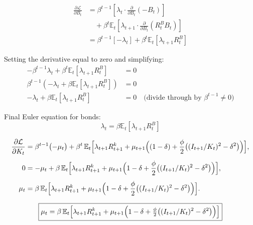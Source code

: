 \documentclass[11pt,preprint]{elsarticle}
\numberwithin{equation}{section}
\numberwithin{figure}{section}
\numberwithin{table}{section}
\begin{document}
\begin{align*}
\frac{\partial \mathcal{L}}{\partial B_t} 
&= \beta^{t-1} \left[ 
   \lambda_t \cdot \frac{\partial}{\partial B_t} (-B_t) %
\right] \\
&\quad + \beta^{t} \mathbb{E}_t \left[ 
   \lambda_{t+1} \cdot \frac{\partial}{\partial B_t} (R^B_t B_t) %
\right] \\
&= \beta^{t-1} \left[ -\lambda_t \right] %
+ \beta^{t} \mathbb{E}_t \left[ \lambda_{t+1} R^B_t \right] %
\end{align*}

Setting the derivative equal to zero and simplifying: \begin{align*}
-\beta^{t-1}\lambda_t + \beta^{t}\mathbb{E}_t\left[\lambda_{t+1}R^B_t\right] &= 0 \\
\beta^{t-1}\left(-\lambda_t + \beta\mathbb{E}_t\left[\lambda_{t+1}R^B_t\right]\right) &= 0 \\
-\lambda_t + \beta\mathbb{E}_t\left[\lambda_{t+1}R^B_t\right] &= 0 \quad \text{(divide through by } \beta^{t-1} \neq 0\text{)}
\end{align*}

Final Euler equation for bonds: \begin{equation}\label{foc_B}
\boxed{\lambda_t = \beta \mathbb{E}_t\left[\lambda_{t+1}R^B_t\right]}
\end{equation}

\begin{align*}
\frac{\partial \mathcal{L}}{\partial K_t}
&= \beta^{t-1}\bigl(-\mu_t\bigr)
  + \beta^t\,\mathbb{E}_t\Bigl[
      \lambda_{t+1}R^k_{t+1}
    + \mu_{t+1}\Bigl(
        (1-\delta)
      + \frac{\phi}{2}\bigl((I_{t+1}/K_t)^2 - \delta^2\bigr)
    \Bigr)
  \Bigr], \\[1ex]
0
&= -\mu_t
  + \beta\,\mathbb{E}_t\Bigl[
      \lambda_{t+1}R^k_{t+1}
    + \mu_{t+1}\Bigl(
        1-\delta
      + \frac{\phi}{2}\bigl((I_{t+1}/K_t)^2 - \delta^2\bigr)
    \Bigr)
  \Bigr], \\[1ex]
\mu_t
&= \beta\,\mathbb{E}_t\Bigl[
      \lambda_{t+1}R^k_{t+1}
    + \mu_{t+1}\Bigl(
        1-\delta
      + \frac{\phi}{2}\bigl((I_{t+1}/K_t)^2 - \delta^2\bigr)
    \Bigr)
  \Bigr].
\end{align*}

\begin{equation}\label{foc_K}
  \boxed{%
    \mu_t
    = \beta\,\mathbb{E}_t\Bigl[
        \lambda_{t+1}R^k_{t+1}
      + \mu_{t+1}\Bigl(
          1-\delta
        + \tfrac{\phi}{2}\bigl((I_{t+1}/K_t)^2 - \delta^2\bigr)
      \Bigr)
    \Bigr]
  }
\end{equation}
\end{document}
